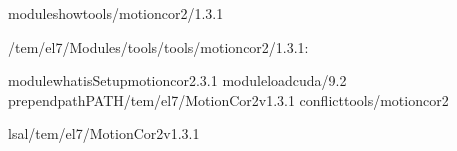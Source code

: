\documentclass[a4paper,10pt,english]{sphinxmanual}
\begin{document}
\begin{sphinxVerbatim}[commandchars=\\\{\}]

\PYGZdl{}\PYGZgt{}moduleshowtools/motioncor2/1.3.1

\PYGZhy{}\PYGZhy{}\PYGZhy{}\PYGZhy{}\PYGZhy{}\PYGZhy{}\PYGZhy{}\PYGZhy{}\PYGZhy{}\PYGZhy{}\PYGZhy{}\PYGZhy{}\PYGZhy{}\PYGZhy{}\PYGZhy{}\PYGZhy{}\PYGZhy{}\PYGZhy{}\PYGZhy{}\PYGZhy{}\PYGZhy{}\PYGZhy{}\PYGZhy{}\PYGZhy{}\PYGZhy{}\PYGZhy{}\PYGZhy{}\PYGZhy{}\PYGZhy{}\PYGZhy{}\PYGZhy{}\PYGZhy{}\PYGZhy{}\PYGZhy{}\PYGZhy{}\PYGZhy{}\PYGZhy{}\PYGZhy{}\PYGZhy{}\PYGZhy{}\PYGZhy{}\PYGZhy{}\PYGZhy{}\PYGZhy{}\PYGZhy{}\PYGZhy{}\PYGZhy{}\PYGZhy{}\PYGZhy{}\PYGZhy{}\PYGZhy{}\PYGZhy{}\PYGZhy{}\PYGZhy{}\PYGZhy{}\PYGZhy{}\PYGZhy{}\PYGZhy{}\PYGZhy{}\PYGZhy{}\PYGZhy{}\PYGZhy{}\PYGZhy{}\PYGZhy{}\PYGZhy{}\PYGZhy{}\PYGZhy{}
/tem/el7/Modules/tools/tools/motioncor2/1.3.1:

module\PYGZhy{}whatisSetupmotioncor2.3.1
moduleloadcuda/9.2
prepend\PYGZhy{}pathPATH/tem/el7/MotionCor2\PYGZus{}v1.3.1
conflicttools/motioncor2
\PYGZhy{}\PYGZhy{}\PYGZhy{}\PYGZhy{}\PYGZhy{}\PYGZhy{}\PYGZhy{}\PYGZhy{}\PYGZhy{}\PYGZhy{}\PYGZhy{}\PYGZhy{}\PYGZhy{}\PYGZhy{}\PYGZhy{}\PYGZhy{}\PYGZhy{}\PYGZhy{}\PYGZhy{}\PYGZhy{}\PYGZhy{}\PYGZhy{}\PYGZhy{}\PYGZhy{}\PYGZhy{}\PYGZhy{}\PYGZhy{}\PYGZhy{}\PYGZhy{}\PYGZhy{}\PYGZhy{}\PYGZhy{}\PYGZhy{}\PYGZhy{}\PYGZhy{}\PYGZhy{}\PYGZhy{}\PYGZhy{}\PYGZhy{}\PYGZhy{}\PYGZhy{}\PYGZhy{}\PYGZhy{}\PYGZhy{}\PYGZhy{}\PYGZhy{}\PYGZhy{}\PYGZhy{}\PYGZhy{}\PYGZhy{}\PYGZhy{}\PYGZhy{}\PYGZhy{}\PYGZhy{}\PYGZhy{}\PYGZhy{}\PYGZhy{}\PYGZhy{}\PYGZhy{}\PYGZhy{}\PYGZhy{}\PYGZhy{}\PYGZhy{}\PYGZhy{}\PYGZhy{}\PYGZhy{}\PYGZhy{}


\PYGZdl{}\PYGZgt{}ls\PYGZhy{}al/tem/el7/MotionCor2\PYGZus{}v1.3.1


\end{sphinxVerbatim}
\end{document}
